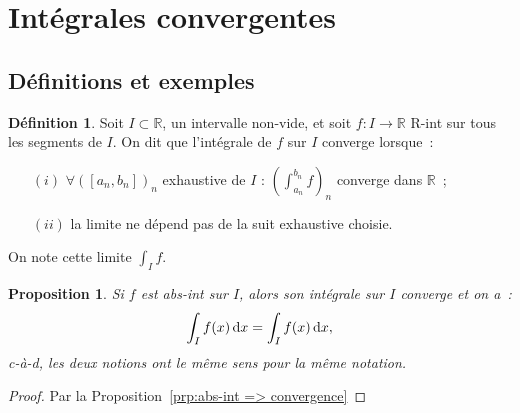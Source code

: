 \documentclass{report}
\newtheorem{prp}[thm]{Proposition}
\theoremstyle{definition}
\newtheorem{déf}[thm]{Définition}
\theoremstyle{remark}
\numberwithin{equation}{section}
\newcommand{\R}{\mathbb R}
\begin{document}
	\section{Intégrales convergentes}
		\subsection{Définitions et exemples}
			\begin{déf} Soit $I \subset \R$, un intervalle non-vide, et soit $f : I \to \R$ R-int sur tous les segments de $I$. On dit que l'intégrale de $f$ sur $I$
			converge lorsque~:
			\begin{itemize}
				\item[$(i)$]  $\forall ([a_n, b_n])_n$ exhaustive de $I$ : $\left(\int_{a_n}^{b_n}f\right)_n$ converge dans $\R$~;
				\item[$(ii)$] la limite ne dépend pas de la suit exhaustive choisie.
			\end{itemize}

			On note cette limite $\int_I f$.
			\end{déf}

			\begin{prp} Si $f$ est abs-int sur $I$, alors son intégrale sur $I$ converge et on a~:
			\begin{equation}
				\int_I f(x)\dif x = \int_I f(x)\dif x,
			\end{equation}
			c-à-d, les deux notions ont le même sens pour la même notation.
			\end{prp}

			\begin{proof} Par la Proposition~\ref{prp:abs-int => convergence}
			\end{proof}
\end{document}
